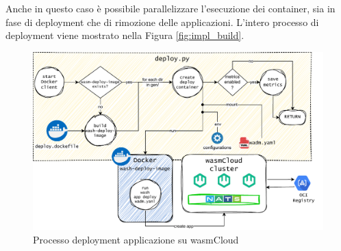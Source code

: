 Anche in questo caso è possibile parallelizzare l'esecuzione dei container, sia in fase di deployment che di rimozione delle applicazioni. L'intero processo di deployment viene mostrato nella Figura \ref{fig:impl_build}.

\FloatBarrier
\begin{figure}[h]
    \centering
    \includegraphics[width=\textwidth]{img/schemi/schemi-implementazione-deploy.drawio.pdf}
    \caption{Processo deployment applicazione su wasmCloud}
    \label{fig:impl_deploy}
\end{figure}
\FloatBarrier